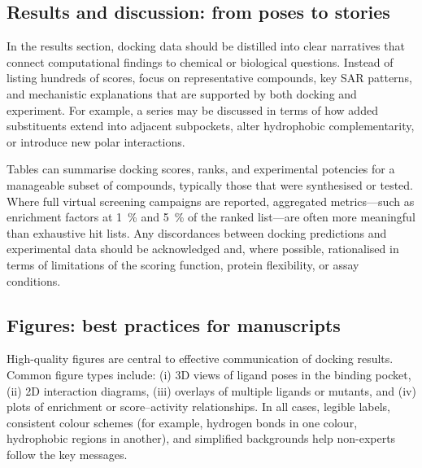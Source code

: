 \documentclass[12pt]{article}
\begin{document}
\subsection{Results and discussion: from poses to stories}

In the results section, docking data should be distilled into clear narratives that connect computational findings to chemical or biological questions.\cite{CH11_Forli2015,CH11_Cheng2012,CH11_zhu2022} 
Instead of listing hundreds of scores, focus on representative compounds, key SAR patterns, and mechanistic explanations that are supported by both docking and experiment.\cite{CH11_Kitchen2004,CH11_Forli2015,CH11_BindingAffinity2018} 
For example, a series may be discussed in terms of how added substituents extend into adjacent subpockets, alter hydrophobic complementarity, or introduce new polar interactions.\cite{CH11_Glide2004,CH11_Kitchen2004,CH11_zhu2022} 

Tables can summarise docking scores, ranks, and experimental potencies for a manageable subset of compounds, typically those that were synthesised or tested.\cite{CH11_Berry2015,CH11_BindingAffinity2018,CH11_EmpiricalScoring2018} 
Where full virtual screening campaigns are reported, aggregated metrics---such as enrichment factors at 1~\% and 5~\% of the ranked list---are often more meaningful than exhaustive hit lists.\cite{CH11_Forli2015,CH11_Cheng2012,CH11_cosconati2010} 
Any discordances between docking predictions and experimental data should be acknowledged and, where possible, rationalised in terms of limitations of the scoring function, protein flexibility, or assay conditions.\cite{CH11_Warren2006,CH11_BindingAffinity2018,CH11_zhu2022} 

\subsection{Figures: best practices for manuscripts}

High-quality figures are central to effective communication of docking results.\cite{CH11_Berry2015,CH11_Forli2015,CH11_zhu2022} 
Common figure types include: (i) 3D views of ligand poses in the binding pocket, (ii) 2D interaction diagrams, (iii) overlays of multiple ligands or mutants, and (iv) plots of enrichment or score--activity relationships.\cite{CH11_Berry2015,CH11_Forli2015,CH11_EmpiricalScoring2018} 
In all cases, legible labels, consistent colour schemes (for example, hydrogen bonds in one colour, hydrophobic regions in another), and simplified backgrounds help non-experts follow the key messages.\cite{CH11_Berry2015,CH11_zhu2022,CH11_cosconati2010} 
\end{document}
